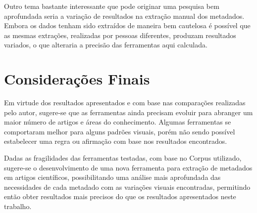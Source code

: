 Outro tema bastante interessante que pode originar uma pesquisa bem aprofundada seria a variação de resultados na extração manual dos metadados. Embora os dados tenham sido extraídos de maneira bem cautelosa é possível que as mesmas extrações, realizadas por pessoas diferentes, produzam resultados variados, o que alteraria a precisão das ferramentas aqui calculada.

\section{Considerações Finais}
\label{sec:final-considerations}

Em virtude dos resultados apresentados e com base nas comparações realizadas pelo autor, sugere-se que as ferramentas ainda precisam evoluir para abranger um maior número de artigos e áreas do conhecimento. Algumas ferramentas se comportaram melhor para alguns padrões visuais, porém não sendo possível estabelecer uma regra ou afirmação com base nos resultados encontrados.

Dadas as fragilidades das ferramentas testadas, com base no Corpus utilizado, sugere-se o desenvolvimento de uma nova ferramenta para extração de metadados em artigos científicos, possibilitando uma análise mais aprofundada das necessidades de cada metadado com as variações visuais encontradas, permitindo então obter resultados mais precisos do que os resultados apresentados neste trabalho.

